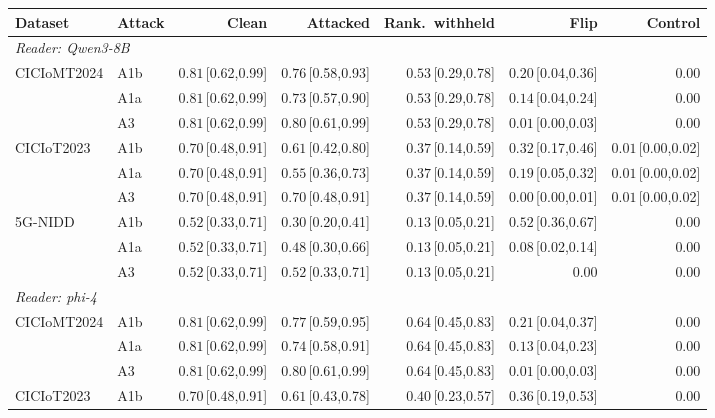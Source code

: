 \footnotesize\setlength\tabcolsep{2pt}
\begin{tabular}{llrrrrr}
\toprule
\textbf{Dataset} & \textbf{Attack} & \textbf{Clean} & \textbf{Attacked} & \textbf{Rank.\ withheld} & \textbf{Flip} & \textbf{Control} \\
\midrule
\multicolumn{7}{l}{\emph{Reader: Qwen3-8B}} \\
\midrule
CICIoMT2024 & A1b & $0.81$\,[0.62,0.99] & $0.76$\,[0.58,0.93] & $0.53$\,[0.29,0.78] & $0.20$\,[0.04,0.36] & $0.00$\rlap{$^{\dagger}$} \\
 & A1a & $0.81$\,[0.62,0.99] & $0.73$\,[0.57,0.90] & $0.53$\,[0.29,0.78] & $0.14$\,[0.04,0.24] & $0.00$\rlap{$^{\dagger}$} \\
 & A3 & $0.81$\,[0.62,0.99] & $0.80$\,[0.61,0.99] & $0.53$\,[0.29,0.78] & $0.01$\,[0.00,0.03] & $0.00$\rlap{$^{\dagger}$} \\
CICIoT2023 & A1b & $0.70$\,[0.48,0.91] & $0.61$\,[0.42,0.80] & $0.37$\,[0.14,0.59] & $0.32$\,[0.17,0.46] & $0.01$\,[0.00,0.02] \\
 & A1a & $0.70$\,[0.48,0.91] & $0.55$\,[0.36,0.73] & $0.37$\,[0.14,0.59] & $0.19$\,[0.05,0.32] & $0.01$\,[0.00,0.02] \\
 & A3 & $0.70$\,[0.48,0.91] & $0.70$\,[0.48,0.91] & $0.37$\,[0.14,0.59] & $0.00$\,[0.00,0.01] & $0.01$\,[0.00,0.02] \\
5G-NIDD & A1b & $0.52$\,[0.33,0.71] & $0.30$\,[0.20,0.41] & $0.13$\,[0.05,0.21] & $0.52$\,[0.36,0.67] & $0.00$\rlap{$^{\dagger}$} \\
 & A1a & $0.52$\,[0.33,0.71] & $0.48$\,[0.30,0.66] & $0.13$\,[0.05,0.21] & $0.08$\,[0.02,0.14] & $0.00$\rlap{$^{\dagger}$} \\
 & A3 & $0.52$\,[0.33,0.71] & $0.52$\,[0.33,0.71] & $0.13$\,[0.05,0.21] & $0.00$\rlap{$^{\dagger}$} & $0.00$\rlap{$^{\dagger}$} \\
\midrule
\multicolumn{7}{l}{\emph{Reader: phi-4}} \\
\midrule
CICIoMT2024 & A1b & $0.81$\,[0.62,0.99] & $0.77$\,[0.59,0.95] & $0.64$\,[0.45,0.83] & $0.21$\,[0.04,0.37] & $0.00$\rlap{$^{\dagger}$} \\
 & A1a & $0.81$\,[0.62,0.99] & $0.74$\,[0.58,0.91] & $0.64$\,[0.45,0.83] & $0.13$\,[0.04,0.23] & $0.00$\rlap{$^{\dagger}$} \\
 & A3 & $0.81$\,[0.62,0.99] & $0.80$\,[0.61,0.99] & $0.64$\,[0.45,0.83] & $0.01$\,[0.00,0.03] & $0.00$\rlap{$^{\dagger}$} \\
CICIoT2023 & A1b & $0.70$\,[0.48,0.91] & $0.61$\,[0.43,0.78] & $0.40$\,[0.23,0.57] & $0.36$\,[0.19,0.53] & $0.00$\rlap{$^{\dagger}$} \\

\end{tabular}
